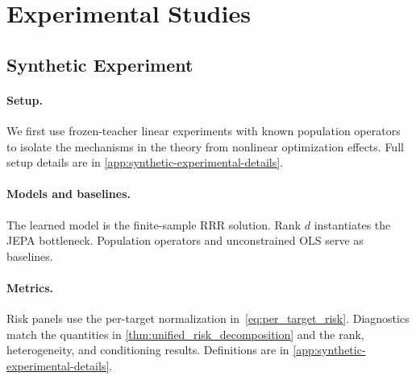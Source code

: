 \section{Experimental Studies}
\label{sec:experiments}


\subsection{Synthetic Experiment}
\label{subsec:synthetic-experiments}

\paragraph{Setup.}
We first use frozen-teacher linear experiments with known population operators
to isolate the mechanisms in the theory from nonlinear optimization effects.
Full setup details are in \cref{app:synthetic-experimental-details}.

\paragraph{Models and baselines.}
The learned model is the finite-sample RRR solution. Rank $d$ instantiates the
JEPA bottleneck. Population operators and unconstrained OLS serve as baselines.

\paragraph{Metrics.}
Risk panels use the per-target normalization in~\eqref{eq:per_target_risk}.
Diagnostics match the quantities in \cref{thm:unified_risk_decomposition} and
the rank, heterogeneity, and conditioning results. Definitions are in
\cref{app:synthetic-experimental-details}.

